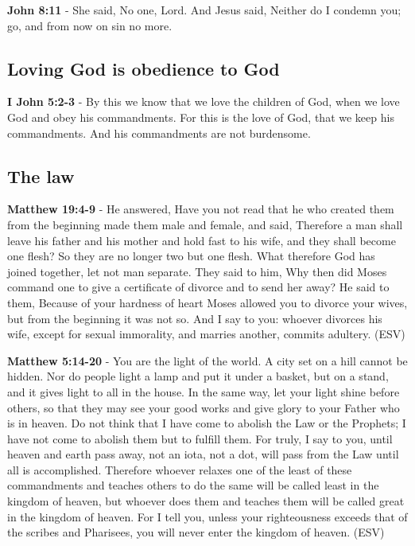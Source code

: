 \documentclass[11pt]{article}
\begin{document}
\textbf{John 8:11} - She said, No one, Lord. And Jesus said, Neither do I condemn you; go, and from now on sin no more.

\subsection{Loving God is obedience to God}
\label{sec:org34c3a5d}
\textbf{I John 5:2-3} - By this we know that we love the children of God, when we love God and obey his commandments. For this is the love of God, that we keep his commandments. And his commandments are not burdensome.

\subsection{The law}
\label{sec:org3f139a1}

\textbf{Matthew 19:4-9} - He answered, Have you not read that he who created them from the beginning made them male and female, and said, Therefore a man shall leave his father and his mother and hold fast to his wife, and they shall become one flesh? So they are no longer two but one flesh. What therefore God has joined together, let not man separate. They said to him, Why then did Moses command one to give a certificate of divorce and to send her away? He said to them, Because of your hardness of heart Moses allowed you to divorce your wives, but from the beginning it was not so. And I say to you: whoever divorces his wife, except for sexual immorality, and marries another, commits adultery. (ESV)

\textbf{Matthew 5:14-20} - You are the light of the world. A city set on a hill cannot be hidden. Nor do people light a lamp and put it under a basket, but on a stand, and it gives light to all in the house. In the same way, let your light shine before others, so that they may see your good works and give glory to your Father who is in heaven. Do not think that I have come to abolish the Law or the Prophets; I have not come to abolish them but to fulfill them. For truly, I say to you, until heaven and earth pass away, not an iota, not a dot, will pass from the Law until all is accomplished. Therefore whoever relaxes one of the least of these commandments and teaches others to do the same will be called least in the kingdom of heaven, but whoever does them and teaches them will be called great in the kingdom of heaven. For I tell you, unless your righteousness exceeds that of the scribes and Pharisees, you will never enter the kingdom of heaven. (ESV)
\end{document}
